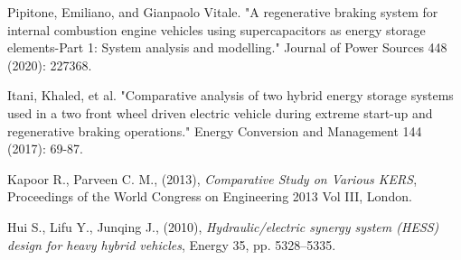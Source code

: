 \documentclass[11pt]{article}
\begin{document}
\begin{thebibliography}{60}
	Pipitone, Emiliano, and Gianpaolo Vitale. "A regenerative braking system for internal combustion engine vehicles using supercapacitors as energy storage elements-Part 1: System analysis and modelling." Journal of Power Sources 448 (2020): 227368.
	
	Itani, Khaled, et al. "Comparative analysis of two hybrid energy storage systems used in a two front wheel driven electric vehicle during extreme start-up and regenerative braking operations." Energy Conversion and Management 144 (2017): 69-87.
	
	Kapoor R., Parveen C. M., (2013), \textit{Comparative Study on Various KERS}, Proceedings of the World Congress on Engineering 2013 Vol III, London.
	
	Hui S., Lifu Y., Junqing J., (2010), \textit{Hydraulic/electric synergy system (HESS) design for heavy hybrid vehicles}, Energy 35, pp. 5328--5335.
	
	
\end{thebibliography}
\end{document}
